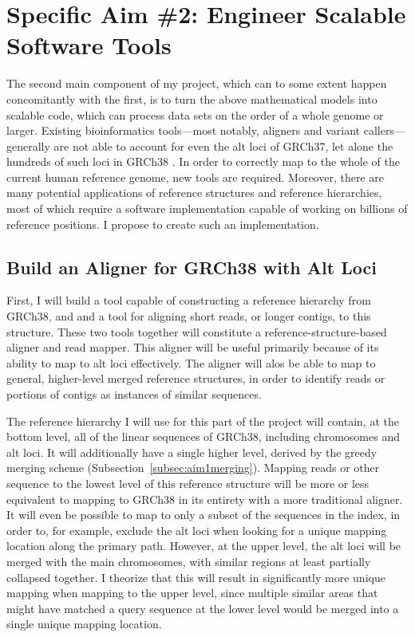 \documentclass[11pt,proposal]{ucthesis}
\begin{document}
        
\section{Specific Aim \#2: Engineer Scalable Software Tools}
\label{sec:aim2}

The second main component of my project, which can to some extent happen concomitantly with the first, is to turn the above mathematical models into scalable code, which can process data sets on the order of a whole genome or larger. Existing bioinformatics tools---most notably, aligners and variant callers---generally are not able to account for even the alt loci of GRCh37, let alone the hundreds of such loci in GRCh38 \cite{church2014story}. In order to correctly map to the whole of the current human reference genome, new tools are required. Moreover, there are many potential applications of reference structures and reference hierarchies, most of which require a software implementation capable of working on billions of reference positions. I propose to create such an implementation.

\subsection{Build an Aligner for GRCh38 with Alt Loci}
\label{subsec:aim2aligner}

First, I will build a tool capable of constructing a reference hierarchy from GRCh38, and and a tool for aligning short reads, or longer contigs, to this structure. These two tools together will constitute a reference-structure-based aligner and read mapper. This aligner will be useful primarily because of its ability to map to alt loci effectively. The aligner will alos be able to map to general, higher-level merged reference structures, in order to identify reads or portions of contigs as instances of similar sequences.

The reference hierarchy I will use for this part of the project will contain, at the bottom level, all of the linear sequences of GRCh38, including chromosomes and alt loci. It will additionally have a single higher level, derived by the greedy merging scheme (Subsection~\ref{subsec:aim1merging}). Mapping reads or other sequence to the lowest level of this reference structure will be more or less equivalent to mapping to GRCh38 in its entirety with a more traditional aligner. It will even be possible to map to only a subset of the sequences in the index, in order to, for example, exclude the alt loci when looking for a unique mapping location along the primary path. However, at the upper level, the alt loci will be merged with the main chromosomes, with similar regions at least partially collapsed together. I theorize that this will result in significantly more unique mapping when mapping to the upper level, since multiple similar areas that might have matched a query sequence at the lower level would be merged into a single unique mapping location.
\end{document}
